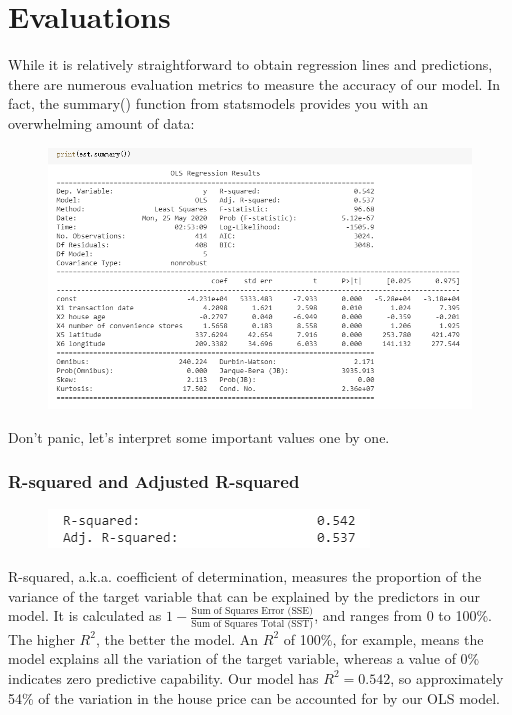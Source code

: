 \documentclass{article}
\begin{document}
\section*{Evaluations}
While it is relatively straightforward to obtain regression lines and predictions, there are numerous evaluation metrics to measure the accuracy of our model. In fact, the summary() function from statsmodels provides you with an overwhelming amount of data:
\begin{figure}[H]\includegraphics[width=\linewidth]{25}\end{figure}
Don't panic, let's interpret some important values one by one.
\subsubsection*{R-squared and Adjusted R-squared}
\begin{figure}[H]\includegraphics[width=0.5\linewidth]{26}\end{figure}
R-squared, a.k.a. coefficient of determination, measures the proportion of the variance of the target variable that can be explained by the predictors in our model. It is calculated as $1 - \frac{\text{Sum of Squares Error (SSE)}}{\text{Sum of Squares Total (SST)}}$, and ranges from 0 to 100\%. The higher $R^2$, the better the model. An $R^2$ of 100\%, for example, means the model explains all the variation of the target variable, whereas a value of 0\% indicates zero predictive capability.
Our model has $R^2 = 0.542$, so approximately 54\% of the variation in the house price can be accounted for by our OLS model.
\end{document}

